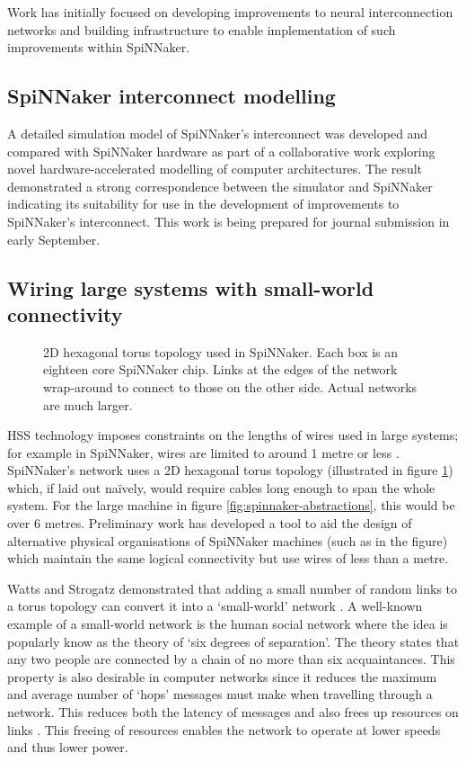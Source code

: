 	Work has initially focused on developing improvements to neural
	interconnection networks and building infrastructure to enable implementation
	of such improvements within SpiNNaker.
	
	\subsection{SpiNNaker interconnect modelling}
		
		A detailed simulation model of SpiNNaker's interconnect was developed and
		compared with SpiNNaker hardware as part of a collaborative work exploring
		novel hardware-accelerated modelling of computer architectures. The result
		demonstrated a strong correspondence between the simulator and SpiNNaker
		indicating its suitability for use in the development of improvements to
		SpiNNaker's interconnect. This work is being prepared for journal submission
		in early September.
	
	\subsection{Wiring large systems with small-world connectivity}
		
		\begin{figure}
			\center
			
			
			\caption{2D hexagonal torus topology used in SpiNNaker. Each box is an
			eighteen core SpiNNaker chip. Links at the edges of the network
			wrap-around to connect to those on the other side. Actual networks are
			much larger.}
			\label{fig:spinn-topology}
		\end{figure}
		
		HSS technology imposes constraints on the lengths of wires used in large
		systems; for example in SpiNNaker, wires are limited to around 1 metre or
		less \cite{sata3spec}. SpiNNaker's network uses a 2D hexagonal torus
		topology (illustrated in figure \ref{fig:spinn-topology}) which, if laid out
		na\"ively, would require cables long enough to span the whole system. For
		the large machine in figure \ref{fig:spinnaker-abstractions}, this would be
		over 6 metres. Preliminary work has developed a tool to aid the design of
		alternative physical organisations of SpiNNaker machines (such as in the
		figure) which maintain the same logical connectivity but use wires of less
		than a metre.
		
		Watts and Strogatz demonstrated that adding a small number of random links
		to a torus topology can convert it into a `small-world' network
		\cite{watts98}. A well-known example of a small-world network is the human
		social network where the idea is popularly know as the theory of `six
		degrees of separation'. The theory states that any two people are connected
		by a chain of no more than six acquaintances. This property is also
		desirable in computer networks since it reduces the maximum and average
		number of `hops' messages must make when travelling through a network. This
		reduces both the latency of messages and also frees up resources on links
		\cite{shin11}. This freeing of resources enables the network to operate at
		lower speeds and thus lower power.
		
